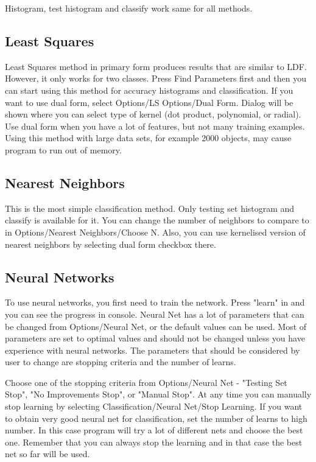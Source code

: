 \documentclass[a4paper,12pt,english]{report}
\begin{document}
Histogram, test histogram and classify work same for all methods.

\newpage
\subsection*{Least Squares}
Least Squares method in primary form produces results that are similar to LDF. However, it only works for two classes. Press Find Parameters first and then you can start using this method for accuracy histograms and classification. If you want to use dual form, select Options/LS Options/Dual Form. Dialog will be shown where you can select type of kernel (dot product, polynomial, or radial). Use dual form when you have a lot of features, but not many training examples. Using this method with large data sets, for example 2000 objects, may cause program to run out of memory.


\subsection*{Nearest Neighbors}
This is the most simple classification method. Only testing set histogram and classify is available for it. You can change the number of neighbors to compare to in Options/Nearest Neighbors/Choose N. Also, you can use kernelised version of nearest neighbors by selecting dual form checkbox there. 
\newpage

\subsection*{Neural Networks}
To use neural networks, you first need to train the network. Press "learn" in and you can see the progress in console. Neural Net has a lot of parameters that can be changed from Options/Neural Net, or the default values can be used. Most of parameters are set to optimal values and should not be changed unless you have experience with neural networks. The parameters that should be considered by user to change are stopping criteria and the number of learns.

Choose one of the stopping criteria from Options/Neural Net - "Testing Set Stop", "No Improvements Stop", or "Manual Stop".  At any time you can manually stop learning by selecting Classification/Neural Net/Stop Learning. If you want to obtain very good neural net for classification, set the number of learns to high number. In this case program will try a lot of different nets and choose the best one. Remember that you can always stop the learning and in that case the best net so far will be used. 
\end{document}
